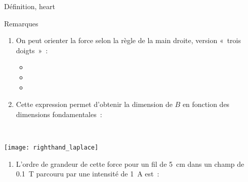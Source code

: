 \documentclass[../main/main.tex]{subfiles}
\begin{document}
\begin{tdefi}{Définition, heart}
\end{tdefi}
\begin{rexem}{Remarques}
  \begin{minipage}[t]{.68\linewidth}
    \begin{enumerate}
      \item On peut orienter la force selon la règle de la main droite, version
        «~trois doigts~»~:
        \begin{itemize}[label=$\diamond$, leftmargin=20pt]
          \item {}
          \item {}
          \item {}
        \end{itemize}
      \item Cette expression permet d'obtenir la dimension de $B$ en fonction des
        dimensions fondamentales~:
    \end{enumerate}
  \end{minipage}
  \hfill
  \begin{minipage}[t]{.30\linewidth}
    ~
    \vspace*{-20pt}
    \begin{center}
      \texttt{[image: righthand\_laplace]}
      \label{fig:ra_lpl}
    \end{center}
  \end{minipage}
  \begin{enumerate}[start=3]
    \item L'ordre de grandeur de cette force pour un fil de \SI{5}{cm} dans un
      champ de \SI{0.1}{T} parcouru par une intensité de \SI{1}{A} est~:

\end{enumerate}
\end{rexem}
\end{document}
